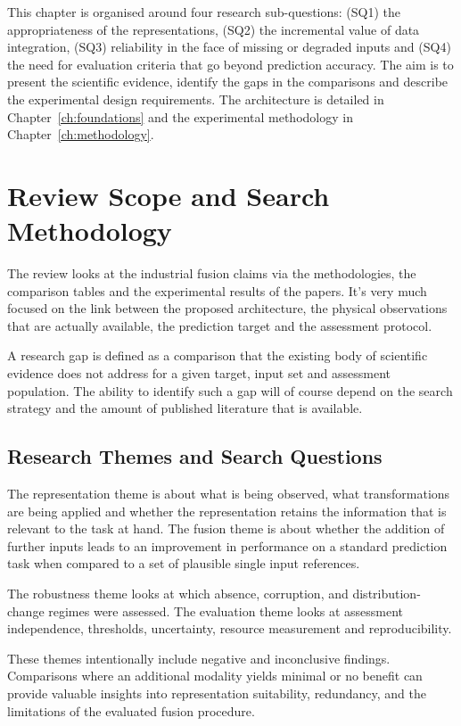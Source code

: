 This chapter is organised around four research sub-questions: (SQ1) the appropriateness of the
representations, (SQ2) the incremental value of data integration, (SQ3) reliability in the face of
missing or degraded inputs and (SQ4) the need for evaluation criteria that go beyond prediction
accuracy. The aim is to present the scientific evidence, identify the gaps in the comparisons and
describe the experimental design requirements. The architecture is detailed in
Chapter~\ref{ch:foundations} and the experimental methodology in Chapter~\ref{ch:methodology}.

\section{Review Scope and Search Methodology}

The review looks at the industrial fusion claims via the methodologies, the comparison tables and
the experimental results of the papers. It's very much focused on the link between the proposed
architecture, the physical observations that are actually available, the prediction target and the
assessment protocol.

A research gap is defined as a comparison that the existing body of scientific evidence does not
address for a given target, input set and assessment population. The ability to identify such a gap
will of course depend on the search strategy and the amount of published literature that is
available.

\subsection{Research Themes and Search Questions}

The representation theme is about what is being observed, what transformations are being applied and
whether the representation retains the information that is relevant to the task at hand. The fusion
theme is about whether the addition of further inputs leads to an improvement in performance on a
standard prediction task when compared to a set of plausible single input references.

The robustness theme looks at which absence, corruption, and distribution-change regimes were
assessed. The evaluation theme looks at assessment independence, thresholds, uncertainty, resource
measurement and reproducibility.

These themes intentionally include negative and inconclusive findings. Comparisons where an
additional modality yields minimal or no benefit can provide valuable insights into representation
suitability, redundancy, and the limitations of the evaluated fusion procedure.

